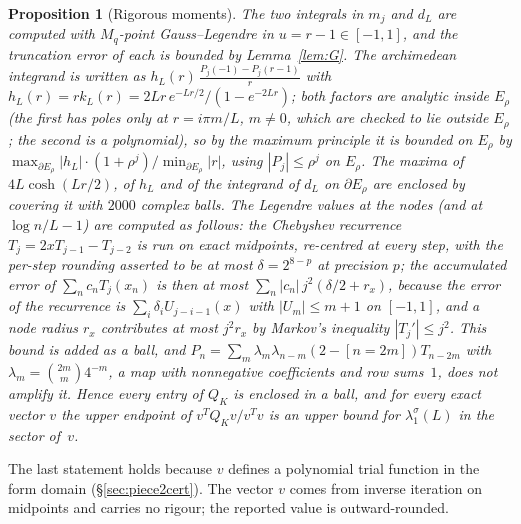 \documentclass[11pt]{amsart}
\newtheorem{proposition}[theorem]{Proposition}
\theoremstyle{definition}
\theoremstyle{remark}
\numberwithin{equation}{section}
\begin{document}
\begin{proposition}[Rigorous moments]\label{prop:upper}
The two integrals in $m_j$ and $d_L$ are computed with $M_q$-point Gauss--Legendre in $u=r-1\in[-1,1]$, and the truncation error of each is bounded by Lemma~\ref{lem:G}. The archimedean integrand is written as $h_L(r)\,\frac{P_j(-1)-P_j(r-1)}r$ with $h_L(r)=rk_L(r)=2Lr\,e^{-Lr/2}/(1-e^{-2Lr})$; both factors are analytic inside $E_\rho$ (the first has poles only at $r=i\pi m/L$, $m\ne0$, which are checked to lie outside $E_\rho$; the second is a polynomial), so by the maximum principle it is bounded on $E_\rho$ by $\max_{\partial E_\rho}|h_L|\cdot(1+\rho^j)/\min_{\partial E_\rho}|r|$, using $|P_j|\le\rho^j$ on $E_\rho$. The maxima of $4L\cosh(Lr/2)$, of $h_L$ and of the integrand of $d_L$ on $\partial E_\rho$ are enclosed by covering it with $2000$ complex balls. The Legendre values at the nodes (and at $\log n/L-1$) are computed as follows: the Chebyshev recurrence $T_j=2xT_{j-1}-T_{j-2}$ is run on exact midpoints, re-centred at every step, with the per-step rounding asserted to be at most $\delta=2^{8-p}$ at precision $p$; the accumulated error of $\sum_nc_nT_j(x_n)$ is then at most $\sum_n|c_n|\,j^2(\delta/2+r_x)$, because the error of the recurrence is $\sum_i\delta_iU_{j-i-1}(x)$ with $|U_m|\le m+1$ on $[-1,1]$, and a node radius $r_x$ contributes at most $j^2r_x$ by Markov's inequality $|T_j'|\le j^2$. This bound is added as a ball, and $P_n=\sum_m\lambda_m\lambda_{n-m}(2-[n=2m])T_{n-2m}$ with $\lambda_m=\binom{2m}m4^{-m}$, a map with nonnegative coefficients and row sums~$1$, does not amplify it. Hence every entry of $Q_K$ is enclosed in a ball, and for every exact vector $v$ the upper endpoint of $v^TQ_Kv/v^Tv$ is an upper bound for $\lambda_1^\sigma(L)$ in the sector of~$v$.
\end{proposition}
The last statement holds because $v$ defines a polynomial trial function in the form domain (\S\ref{sec:piece2cert}). The vector $v$ comes from inverse iteration on midpoints and carries no rigour; the reported value is outward-rounded.
\end{document}
